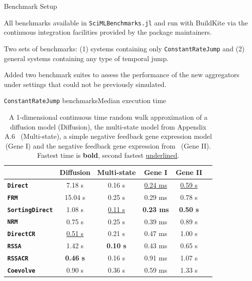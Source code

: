 \documentclass[
  ignorenonframetext,
  aspectratio=169,
  xcolor={dvipsnames,rgb}
]{beamer}
\begin{document}
\begin{frame}{Benchmark Setup}

All benchmarks available in \texttt{SciMLBenchmarks.jl} and run with BuildKite via the continuous integration facilities provided by the package maintainers.

\vspace{2em}

Two sets of benchmarks: (1) systems containing only \texttt{ConstantRateJump} and (2) general systems containing any type of temporal jump.

\vspace{2em}

Added two benchmark suites to assess the performance of the new aggregators under settings that could not be previously simulated.

\end{frame}

\begin{frame}{\texttt{ConstantRateJump} benchmarks}{Median execution time}

\begin{table}
\centering
\begin{tabular}{lccccc}
\toprule
 & \multicolumn{1}{c}{\textbf{ Diffusion }} & \multicolumn{1}{c}{\textbf{ Multi-state }} & \multicolumn{1}{c}{\textbf{ Gene I }} & \multicolumn{1}{c}{\textbf{ Gene II }} \\
\hline
\textbf{\texttt{Direct}}         & 7.18 s             & 0.16 s             & \underline{0.24 ms} & \underline{0.59 s} \\
\textbf{\texttt{FRM}}            & 15.04 s            & 0.25 s             & 0.29 ms             & 0.78 s             \\
\textbf{\texttt{SortingDirect}}  & 1.08 s             & \underline{0.11 s} & \textbf{0.23 ms}    & \textbf{0.50 s}    \\
\textbf{\texttt{NRM}}            & 0.75 s             & 0.25 s             & 0.39 ms             & 0.89 s             \\
\textbf{\texttt{DirectCR}}       & \underline{0.51 s} & 0.21 s             & 0.47 ms             & 1.00 s             \\
\textbf{\texttt{RSSA}}           & 1.42 s             & \textbf{0.10 s}    & 0.43 ms             & 0.65 s             \\
\textbf{\texttt{RSSACR}}         & \textbf{0.46 s}    & 0.16 s             & 0.91 ms             & 1.07 s             \\
\textbf{\texttt{Coevolve}}       & 0.90 s             & 0.36 s             & 0.59 ms             & 1.33 s             \\
\bottomrule
\end{tabular}
\caption{A 1-dimensional continuous time random walk approximation of a diffusion model (Diffusion), the multi-state model from Appendix A.6~\citet{marchetti2017} (Multi-state), a simple negative feedback gene expression model (Gene I) and the negative feedback gene expression from~\citet{gupta2018} (Gene II). Fastest time is \textbf{bold}, second fastest \underline{underlined}.}
\end{table}

\end{frame}
\end{document}
